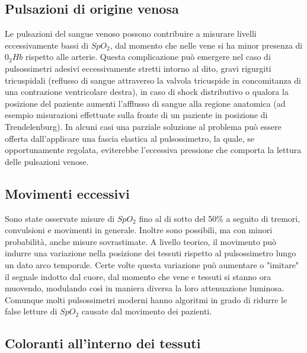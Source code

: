 \documentclass[12pt,a4paper, twoside, openright]{report}
\begin{document}
\subsection{Pulsazioni di origine venosa}

Le pulsazioni del sangue venoso possono contribuire a misurare livelli eccessivamente bassi di $SpO_2$, dal momento che nelle vene si ha minor presenza di $0_2Hb$ rispetto alle arterie. 
Questa complicazione può emergere nel caso di pulsossimetri adesivi eccessivamente stretti intorno al dito, gravi rigurgiti tricuspidali (reflusso di sangue attraverso la valvola tricuspide in concomitanza di una contrazione ventricolare destra), in caso di shock distributivo o qualora la posizione del paziente aumenti l'afflusso di sangue alla regione anatomica (ad esempio misurazioni effettuate sulla fronte di un paziente in posizione di Trendelenburg). 
In alcuni casi una parziale soluzione al problema può essere offerta dall'applicare una fascia elastica al pulsossimetro, la quale, se opportunamente regolata, eviterebbe l'eccessiva pressione che comporta la lettura delle pulsazioni venose.


\subsection{Movimenti eccessivi}

Sono state osservate misure di $SpO_2$ fino al di sotto del 50\% a seguito di tremori, convulsioni e movimenti in generale. 
Inoltre sono possibili, ma con minori probabilità, anche misure sovrastimate. 
A livello teorico, il movimento può indurre una variazione nella posizione dei tessuti rispetto al pulsossimetro lungo un dato arco temporale. 
Certe volte questa variazione può aumentare o "imitare" il segnale indotto dal cuore, dal momento che vene e tessuti si stanno ora muovendo, modulando così in maniera diversa la loro attenuazione luminosa. 
Comunque molti pulsossimetri moderni hanno algoritmi in grado di ridurre le false letture di $SpO_2$ causate dal movimento dei pazienti.


\subsection{Coloranti all'interno dei tessuti}
\end{document}
